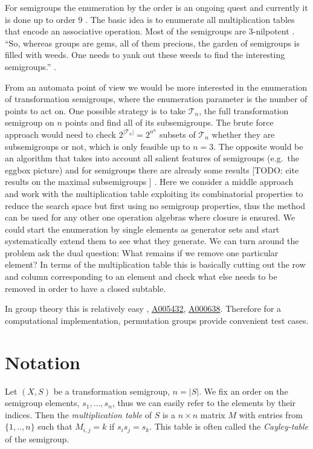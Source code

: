 \documentclass{amsart}
\newcommand{\cT}{{\mathcal T}}
\newcommand{\todo}[1]{ \small \textsf{[TODO:  #1 ]} \normalsize}
\theoremstyle{plain}
\theoremstyle{definition}
\begin{document}
For semigroups the enumeration by the order is an ongoing quest and currently it is done up to order 9 \cite{smallsemi}. The basic idea is to enumerate all multiplication tables that encode an associative operation. %
Most of the semigroups are 3-nilpotent \cite{smallsemi}. ``So, whereas groups are
gems, all of them precious, the garden of semigroups is filled with weeds. One
needs to yank out these weeds to find the interesting semigroups.'' \cite{QBook}.

From an automata point of view we would be more interested in the enumeration of transformation semigroups, where the enumeration parameter is the number of points to act on. One possible strategy is to take $\cT_n$, the full transformation semigroup on $n$ points and find all of its subsemigroups. The brute force approach would need to check $2^{|\cT_n|}=2^{n^n}$ subsets of $\cT_n$ whether they are subsemigroups or not, which is only feasible up to $n=3$.
The opposite would be an algorithm that takes into account all salient features of semigroups (e.g.\ the eggbox picture) and for semigroups there are already some results \todo{cite results on the maximal subsemigroups}.  
Here we consider a middle approach and work with the multiplication table exploiting its combinatorial properties to reduce the search space but first using no semigroup properties, thus the method can be used for any other one operation algebras where closure is ensured. We could start the enumeration by single elements as generator sets and start systematically extend them to see what they generate. We can turn around the problem ask the dual question: What remains if we remove one particular element? In terms of the multiplication table this is basically cutting out the row and column corresponding to an element and check what else needs to be removed in order to have a closed subtable.

 In group theory this is relatively easy \cite{Pfeiffer04CountingSubGroups}, \href{https://oeis.org/A005432}{A005432}, \href{https://oeis.org/A000638}{A000638}.  Therefore for a computational implementation, permutation groups provide convenient test cases.



\section{Notation}
Let $(X,S)$ be a transformation semigroup, $n=|S|$. We fix an order on the semigroup elements, $s_1,\ldots, s_n$, thus we can easily refer to the elements by their indices. 
Then the  \emph{multiplication table} of $S$ is a $n\times n$ matrix $M$ with entries from $\{1,..,n\}$ such that $M_{i,j}=k$ if $s_is_j=s_k$. This table is often called the \emph{Cayley-table} of the semigroup.
\end{document}
